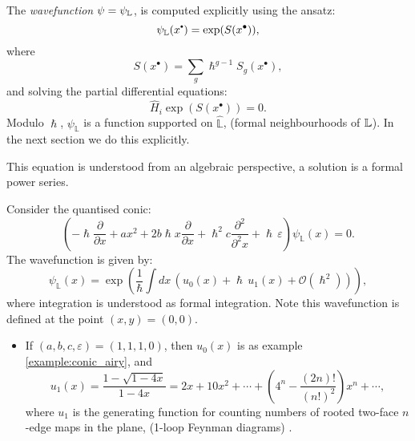     
    
    The \emph{wavefunction} \( \psi = \psi_{\mathbb{L}} \),  is computed explicitly using the ansatz: 
    \[ \psi_{\cL}(x^{\sbt}) = \exp(S(x^{\bullet})),\]
    where
    \[ S(x^{\bullet}) = \sum_g \hslash^{g-1} S_g(x^{\bullet}),\]
    and solving the partial differential equations:
    \[ \widehat{H}_i \exp(S(x^{\bullet})) = 0. \] 
    Modulo \(\hslash \), \( \psi_{\mathbb{L} }\) is a function supported on \( \widehat{\mathbb{ L}} \), (formal neighbourhoods of \(\mathbb{L}\)). In the next section we do this explicitly.
    
    
    \begin{rem}   This equation is understood from an algebraic perspective, a solution is a formal power series.
    \end{rem}
    
    \begin{ex} Consider the quantised conic:
    \[ \left( - \hslash \frac{\partial}{\partial x} + a x^2 + 2 b \hslash x \frac{ \partial }{\partial x}+ \hslash^2 c \frac{\partial^2}{\partial^2 x} + \hslash \, \varepsilon \right) \psi_{\mathbb{L}}(x)  = 0. \]
    The wavefunction is given by:
    \[ \psi_{\mathbb{L} }(x) = \exp \left( \frac{1}{\hslash} \int dx \, ( u_0(x)  + \hslash \, u_1(x) + \mathcal{O}(\hslash^2) ) \right), \]
    where integration is understood as formal integration.  Note this wavefunction is defined at the point \((x,y)=(0,0)\).
    \begin{itemize}
        \item  If \( (a,b,c,\varepsilon) = (1,1,1,0)\), then \( u_0(x)\) is as example \ref{example:conic_airy}, and
        \[u_1(x) =\frac{1 - \sqrt{1 -4x}}{1-4x}= 2 x + 10 x^2 + \cdots + \left(4^n - \frac{(2n)!}{(n!)^2}\right) x^n + \cdots,\]
        where \(u_1\) is the generating function for counting numbers of rooted two-face \(n\)-edge maps in the plane, (1-loop Feynman diagrams) \cite{feynmaps}. 
    \end{itemize}
    \end{ex}
    
